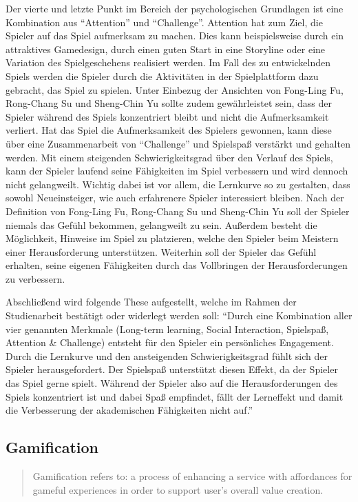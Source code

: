 	Der vierte und letzte Punkt im Bereich der psychologischen Grundlagen ist eine Kombination aus \enquote{Attention} und \enquote{Challenge}. Attention hat zum Ziel, die Spieler auf das Spiel aufmerksam zu machen. Dies kann beispielsweise durch ein attraktives Gamedesign, durch einen guten Start in eine Storyline oder eine Variation des Spielgeschehens realisiert werden. Im Fall des zu entwickelnden Spiels werden die Spieler durch die Aktivitäten in der Spielplattform dazu gebracht, das Spiel zu spielen. Unter Einbezug der Ansichten von Fong-Ling Fu, Rong-Chang Su und Sheng-Chin Yu sollte zudem gewährleistet sein, dass der Spieler während des Spiels konzentriert bleibt und nicht die Aufmerksamkeit verliert. Hat das Spiel die Aufmerksamkeit des Spielers gewonnen, kann diese über eine Zusammenarbeit von \enquote{Challenge} und Spielspaß verstärkt und gehalten werden.
	Mit einem steigenden Schwierigkeitsgrad über den Verlauf des Spiels, kann der Spieler laufend seine Fähigkeiten im Spiel verbessern und wird dennoch nicht gelangweilt. Wichtig dabei ist vor allem, die Lernkurve so zu gestalten, dass sowohl Neueinsteiger, wie auch erfahrenere Spieler interessiert bleiben. Nach der Definition von Fong-Ling Fu, Rong-Chang Su und Sheng-Chin Yu soll der Spieler niemals das Gefühl bekommen, gelangweilt zu sein. Außerdem besteht die Möglichkeit, Hinweise im Spiel zu platzieren, welche den Spieler beim Meistern einer Herausforderung unterstützen. Weiterhin soll der Spieler das Gefühl erhalten, seine eigenen Fähigkeiten durch das Vollbringen der Herausforderungen zu verbessern.

	Abschließend wird folgende These aufgestellt, welche im Rahmen der Studienarbeit bestätigt oder widerlegt werden soll:
	\enquote{Durch eine Kombination aller vier genannten Merkmale (Long-term learning, Social Interaction, Spielspaß, Attention \& Challenge) entsteht für den Spieler ein persönliches Engagement. Durch die Lernkurve und den ansteigenden Schwierigkeitsgrad fühlt sich der Spieler herausgefordert. Der Spielspaß unterstützt diesen Effekt, da der Spieler das Spiel gerne spielt. Während der Spieler also auf die Herausforderungen des Spiels konzentriert ist und dabei Spaß empfindet, fällt der Lerneffekt und damit die Verbesserung der akademischen Fähigkeiten nicht auf.}

\subsection{Gamification}\label{ssec:gamification}
	\begin{quote}
		\vspace{\baselineskip}\hfill\begin{minipage}{0.96\textwidth}
			Gamification refers to: a process of enhancing a service with affordances for gameful experiences in order to support user's overall value creation.
		\end{minipage}
	\end{quote}

